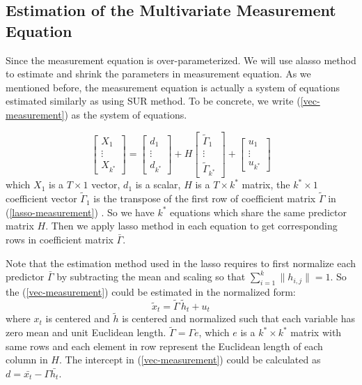 \documentclass[titlepage,11pt]{article}
\begin{document}
\subsection{Estimation of the Multivariate Measurement Equation}
Since the measurement equation is over-parameterized. We will use alasso method to estimate and shrink the parameters in measurement equation. As we mentioned before, the measurement equation is actually a system of equations estimated similarly as using SUR method.  To be concrete, we write (\ref{vec-measurement}) as the system of equations.

\begin{equation}
\label{measurement1}
\left[ \begin{array}{c} X_1 \\\vdots \\ X_{k^*} \end{array} \right]  =
\left[ \begin{array}{c} d_1 \\\vdots \\ d_{k^*} \end{array} \right] +
H \left[ \begin{array}{c} \tilde{\Gamma}_1 \\\vdots \\ \tilde{\Gamma}_{k^*} \end{array} \right] + \left[ \begin{array}{c} u_1 \\\vdots \\ u_{k^*} \end{array} \right]
\end{equation}
which $X_1$ is a $T \times 1$ vector, $d_1$ is a scalar, $H$ is a $T \times k^*$ matrix, the $k^* \times 1$ coefficient vector $\tilde{\Gamma}_1$ is the transpose of the first row of coefficient matrix $\tilde{\Gamma}$ in (\ref{lasso-measurement}) .
So we have $k^*$ equations which share the same predictor matrix $H$. Then we apply lasso method in each equation to get corresponding rows in coefficient matrix $\bar{\Gamma}$.



Note that the estimation method used in the lasso requires to first normalize each predictor $\bar{\Gamma}$ by subtracting the mean and scaling so that $\sum_{i=1}^{k}\|h_{i,j}\| = 1$. So the (\ref{vec-measurement}) could be estimated in the normalized form:
\begin{equation}
\label{lasso-measurement}
 \tilde{ x}_t=  \tilde{\Gamma} \,  \tilde{ h}_{t}+ u_{t}
\end{equation}
where $x_t$ is centered and $\tilde{ h}$ is centered and normalized such that each variable has zero mean and unit Euclidean length. $\tilde{\Gamma}=\Gamma e$, which $e$ is a $k^* \times k^*$ matrix with same rows and each element in row represent the Euclidean length of each column in $H$. The intercept in (\ref{vec-measurement}) could be calculated as  $d = \bar{x_t}-\Gamma \bar{h_t}$.
\end{document}
